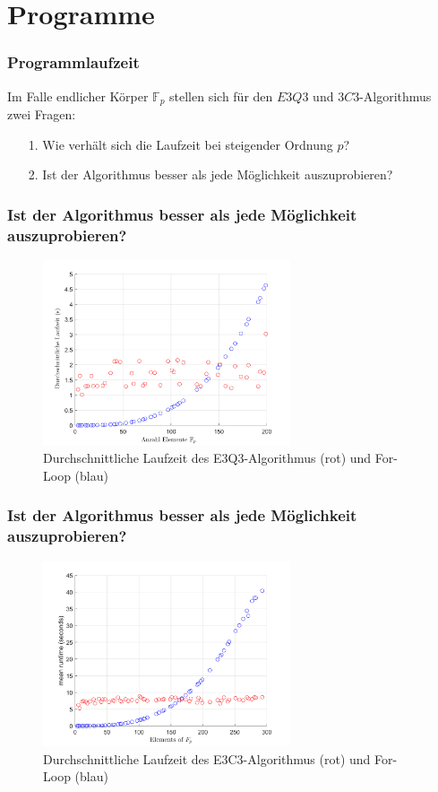 \documentclass[11pt]{beamer}
\newcommand{\F}[1]{\mathbb{F}_{#1}}
\theoremstyle{custom}
\theoremstyle{custom}
\begin{document}
	\section{Programme}
	\begin{frame}
		\frametitle{Programmlaufzeit}
		Im Falle endlicher Körper $\F{p}$ stellen sich für den $E3Q3$ und $3C3$-Algorithmus zwei Fragen:\pause
		\begin{enumerate}
			\item[1.] Wie verhält sich die Laufzeit bei steigender Ordnung $p$?\pause
			\item[2.] Ist der Algorithmus besser als jede Möglichkeit auszuprobieren?
		\end{enumerate}
	\end{frame}
	\begin{frame}
		\frametitle{Ist der Algorithmus besser als jede Möglichkeit auszuprobieren?}
		\begin{figure}[H]
			\includegraphics[width=0.65\textwidth]{"images/runtime_e3q3_for_loop.png"}
			\caption*{Durchschnittliche Laufzeit des E3Q3-Algorithmus (rot) und For-Loop (blau)}
		\end{figure}
	\end{frame}
	\begin{frame}
		\frametitle{Ist der Algorithmus besser als jede Möglichkeit auszuprobieren?}
		\begin{figure}[H]
			\includegraphics[width=0.65\textwidth]{"images/runtime_e3c3_for_loop_2.png"}
			\caption*{Durchschnittliche Laufzeit des E3C3-Algorithmus (rot) und For-Loop (blau)}
		\end{figure}
	\end{frame}
\end{document}
